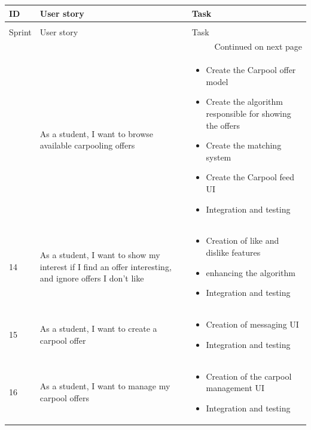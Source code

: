 \begin{longtable}{|l|p{6cm}|p{8cm}|}
\hline
ID & User story & Task\\
\hline
\endfirsthead

\multicolumn{3}{c}{{\bfseries}} \\
\hline
Sprint & User story & Task\\
\hline
\endhead

\hline \multicolumn{3}{|r|}{{Continued on next page}} \\ \hline
\endfoot

\hline
\endlastfoot
13 & As a student, I want to browse available carpooling offers & \begin{itemize}
    \item Create the Carpool offer model
    \item Create the algorithm responsible for showing the offers
    \item Create the matching system
    \item Create the Carpool feed UI
    \item Integration and testing
\end{itemize} \\ \hline

14 & As a student, I want to show my interest if I find an offer interesting, and ignore offers I don’t like & \begin{itemize}
    \item Creation of like and dislike features
    \item enhancing the algorithm
    \item Integration and testing
\end{itemize} \\ \hline

15 & As a student, I want to create a carpool offer & \begin{itemize}
    \item Creation of messaging UI
    \item Integration and testing
\end{itemize} \\ \hline

16 & As a student, I want to manage my carpool offers & \begin{itemize}
    \item Creation of the carpool management UI
    \item Integration and testing
\end{itemize} \\ \hline


\end{longtable}
